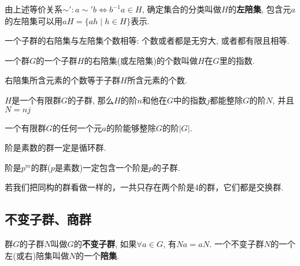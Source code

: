 \begin{Definition}[左陪集]
由上述等价关系$\sim': a \sim' b \Leftrightarrow b^{-1} a \in H$, 确定集合的分类叫做$H$的\textbf{左陪集}, 包含元$a$的左陪集可以用$aH = \{ ah \mid h \in H \}$表示.
\end{Definition}

\begin{Theorem}
一个子群的右陪集与左陪集个数相等: 个数或者都是无穷大, 或者都有限且相等.
\end{Theorem}

\begin{Definition}[指数]
一个群$G$的一个子群$H$的右陪集(或左陪集)的个数叫做$H$在$G$里的指数.
\end{Definition}

\begin{Theorem}
右陪集所含元素的个数等于子群$H$所含元素的个数.
\end{Theorem}

\begin{Theorem}
$H$是一个有限群$G$的子群, 那么$H$的阶$n$和他在$G$中的指数$j$都能整除$G$的阶$N$, 并且$N = nj$
\end{Theorem}

\begin{Theorem}[元素的阶整除群的阶]
一个有限群$G$的任何一个元$a$的阶能够整除$G$的阶$|G|$.
\end{Theorem}

\begin{Proposition}
阶是素数的群一定是循环群.
\end{Proposition}

\begin{Proposition}
阶是$p^m$的群($p$是素数)一定包含一个阶是$p$的子群.
\end{Proposition}

\begin{Proposition}
若我们把同构的群看做一样的，一共只存在两个阶是4的群，它们都是交换群.
\end{Proposition}


\subsection{不变子群、商群}

\begin{Definition}[不变子群]
群$G$的子群$N$叫做$G$的\textbf{不变子群}, 如果$\forall a \in G$, 有$Na = aN$. 一个不变子群$N$的一个左(或右)陪集叫做$N$的一个\textbf{陪集}.
\end{Definition}

